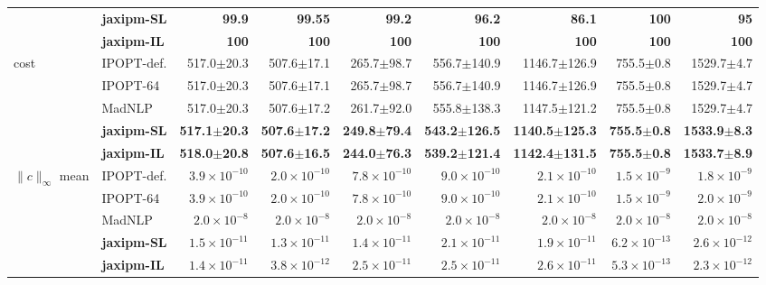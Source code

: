 \begin{table}[p]
{\begin{tabular}{@{}l l r r r r r r r@{}}
 & \textbf{jaxipm-SL} & \textbf{99.9} & \textbf{99.55} & \textbf{99.2} & \textbf{96.2} & \textbf{86.1} & \textbf{100} & \textbf{95} \\
 & \textbf{jaxipm-IL} & \textbf{100} & \textbf{100} & \textbf{100} & \textbf{100} & \textbf{100} & \textbf{100} & \textbf{100} \\
\midrule
\multirow{5}{*}{cost} & IPOPT-def. & 517.0$\pm$20.3 & 507.6$\pm$17.1 & 265.7$\pm$98.7 & 556.7$\pm$140.9 & 1146.7$\pm$126.9 & 755.5$\pm$0.8 & 1529.7$\pm$4.7 \\
 & IPOPT-64 & 517.0$\pm$20.3 & 507.6$\pm$17.1 & 265.7$\pm$98.7 & 556.7$\pm$140.9 & 1146.7$\pm$126.9 & 755.5$\pm$0.8 & 1529.7$\pm$4.7 \\
 & MadNLP & 517.0$\pm$20.3 & 507.6$\pm$17.2 & 261.7$\pm$92.0 & 555.8$\pm$138.3 & 1147.5$\pm$121.2 & 755.5$\pm$0.8 & 1529.7$\pm$4.7 \\
 & \textbf{jaxipm-SL} & \textbf{517.1$\pm$20.3} & \textbf{507.6$\pm$17.2} & \textbf{249.8$\pm$79.4} & \textbf{543.2$\pm$126.5} & \textbf{1140.5$\pm$125.3} & \textbf{755.5$\pm$0.8} & \textbf{1533.9$\pm$8.3} \\
 & \textbf{jaxipm-IL} & \textbf{518.0$\pm$20.8} & \textbf{507.6$\pm$16.5} & \textbf{244.0$\pm$76.3} & \textbf{539.2$\pm$121.4} & \textbf{1142.4$\pm$131.5} & \textbf{755.5$\pm$0.8} & \textbf{1533.7$\pm$8.9} \\
\midrule
\multirow{5}{*}{$\|c\|_\infty$ mean} & IPOPT-def. & $3.9\!\times\!10^{-10}$ & $2.0\!\times\!10^{-10}$ & $7.8\!\times\!10^{-10}$ & $9.0\!\times\!10^{-10}$ & $2.1\!\times\!10^{-10}$ & $1.5\!\times\!10^{-9}$ & $1.8\!\times\!10^{-9}$ \\
 & IPOPT-64 & $3.9\!\times\!10^{-10}$ & $2.0\!\times\!10^{-10}$ & $7.8\!\times\!10^{-10}$ & $9.0\!\times\!10^{-10}$ & $2.1\!\times\!10^{-10}$ & $1.5\!\times\!10^{-9}$ & $2.0\!\times\!10^{-9}$ \\
 & MadNLP & $2.0\!\times\!10^{-8}$ & $2.0\!\times\!10^{-8}$ & $2.0\!\times\!10^{-8}$ & $2.0\!\times\!10^{-8}$ & $2.0\!\times\!10^{-8}$ & $2.0\!\times\!10^{-8}$ & $2.0\!\times\!10^{-8}$ \\
 & \textbf{jaxipm-SL} & {\boldmath$1.5\!\times\!10^{-11}$} & {\boldmath$1.3\!\times\!10^{-11}$} & {\boldmath$1.4\!\times\!10^{-11}$} & {\boldmath$2.1\!\times\!10^{-11}$} & {\boldmath$1.9\!\times\!10^{-11}$} & {\boldmath$6.2\!\times\!10^{-13}$} & {\boldmath$2.6\!\times\!10^{-12}$} \\
 & \textbf{jaxipm-IL} & {\boldmath$1.4\!\times\!10^{-11}$} & {\boldmath$3.8\!\times\!10^{-12}$} & {\boldmath$2.5\!\times\!10^{-11}$} & {\boldmath$2.5\!\times\!10^{-11}$} & {\boldmath$2.6\!\times\!10^{-11}$} & {\boldmath$5.3\!\times\!10^{-13}$} & {\boldmath$2.3\!\times\!10^{-12}$} \\

\end{tabular}}
\end{table}

